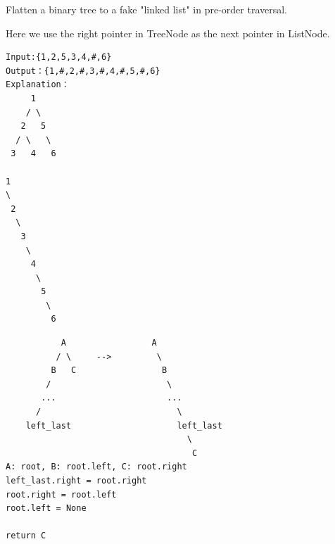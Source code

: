 \documentclass[11pt]{article}
\begin{document}
Flatten a binary tree to a fake "linked list" in pre-order traversal.

Here we use the right pointer in TreeNode as the next pointer in
ListNode.

\begin{verbatim}
Input:{1,2,5,3,4,#,6}
Output：{1,#,2,#,3,#,4,#,5,#,6}
Explanation：
     1
    / \
   2   5
  / \   \
 3   4   6

1
\
 2
  \
   3
    \
     4
      \
       5
        \
         6
\end{verbatim}

\begin{verbatim}
           A                 A
          / \     -->         \
         B   C                 B
        /                       \
       ...                      ...
      /                           \
    left_last                     left_last
                                    \
                                     C
A: root, B: root.left, C: root.right
left_last.right = root.right
root.right = root.left
root.left = None

return C
\end{verbatim}
\end{document}
